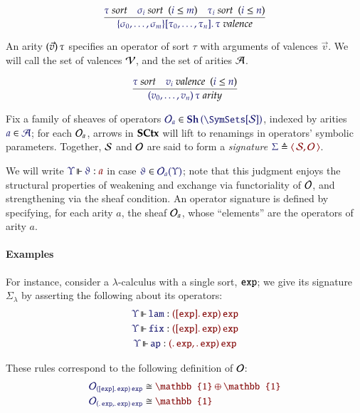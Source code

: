 \[
  \infer{
    \IsValence{
      \MkValence
        {\sigma_0,\dots,\sigma_m}
        {\tau_0,\dots,\tau_n}
        {\tau}
    }
  }{
    \IsSort{\tau}
&
    \HypJ{\IsSort{\sigma_i}}{\Leq{i}{m}}
&
    \HypJ{\IsSort{\tau_i}}{\Leq{i}{n}}
  }
\]

An arity $(\vec{v})\, \tau$ specifies an operator of sort $\tau$ with
arguments of valences $\vec{v}$. We will call the set of valences $\mathcal{V}$,
and the set of arities $\mathcal{A}$.

\[
  \infer{
    \IsArity{
      \MkArity
        {v_0,\ldots,v_n}
        {\tau}
    }
  }{
    \IsSort{\tau}
&
    \HypJ
      {\IsValence{v_i}}
      {\Leq{i}{n}}
  }
\]


Fix a family of sheaves of operators
$\Member{\Operators_a}{\Sheaves{\SCtxSite}}$, indexed by arities
$\Member{a}{\Arities}$; for each $\mathcal{O}_a$, arrows in $\mathbf{SCtx}$ will lift to
renamings in operators' symbolic parameters. Together, $\mathcal{S}$ and $\mathcal{O}$ are said to form a \emph{signature}
$\Define{\Sigma}{\Pair{\Sorts}{\Operators}}$.

We will write $\IsOperator{\Upsilon}{\vartheta}{a}$ in case
$\Member{\vartheta}{\Operators_a(\Upsilon)}$; note that this judgment enjoys
the structural properties of weakening and exchange via functoriality of
$\mathcal{O}$, and strengthening via the sheaf condition. An operator signature
is defined by specifying, for each arity $a$, the sheaf $\mathcal{O}_a$, whose
``elements'' are the operators of arity $a$.


\paragraph{Examples}

For instance, consider a $\lambda$-calculus with a single sort, $\mathtt{exp}$; we
give its signature $\Sigma_{\lambda}$ by asserting the following about its
operators:
\begin{gather*}
  \IsOperator{\Upsilon}{\mathtt{lam}}{
    \MkArity{
      \MkValence{}{\SortExp}{\SortExp}
    }{\SortExp}
  }\\
  \IsOperator{\Upsilon}{\mathtt{fix}}{
    \MkArity{
      \MkValence{}{\SortExp}{\SortExp}
    }{\SortExp}
  }\\
  \IsOperator{\Upsilon}{\mathtt{ap}}{
    \MkArity{
      \MkValence{}{}{\SortExp},
      \MkValence{}{}{\SortExp}
    }{\SortExp}
  }
\end{gather*}

These rules correspond to the following definition of $\mathcal{O}$:
\begin{align*}
  \ADefineEquiv{
    \Operators_{
       \MkArity{
        \MkValence{}{\SortExp}{\SortExp}
      }{\SortExp}
    }
  }{
    \mathbb{1}\oplus\mathbb{1}
  }
  \\
  \ADefineEquiv{
    \Operators_{
      \MkArity{
        \MkValence{}{}{\SortExp},
        \MkValence{}{}{\SortExp}
      }{\SortExp}
    }
  }{
    \mathbb{1}
  }
\end{align*}

